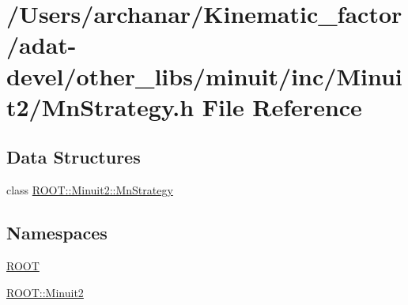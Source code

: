 \hypertarget{adat-devel_2other__libs_2minuit_2inc_2Minuit2_2MnStrategy_8h}{}\section{/\+Users/archanar/\+Kinematic\+\_\+factor/adat-\/devel/other\+\_\+libs/minuit/inc/\+Minuit2/\+Mn\+Strategy.h File Reference}
\label{adat-devel_2other__libs_2minuit_2inc_2Minuit2_2MnStrategy_8h}
\subsection*{Data Structures}
\begin{DoxyCompactItemize}
\item 
class \mbox{\hyperlink{classROOT_1_1Minuit2_1_1MnStrategy}{R\+O\+O\+T\+::\+Minuit2\+::\+Mn\+Strategy}}
\end{DoxyCompactItemize}
\subsection*{Namespaces}
\begin{DoxyCompactItemize}
\item 
 \mbox{\hyperlink{namespaceROOT}{R\+O\+OT}}
\item 
 \mbox{\hyperlink{namespaceROOT_1_1Minuit2}{R\+O\+O\+T\+::\+Minuit2}}
\end{DoxyCompactItemize}
